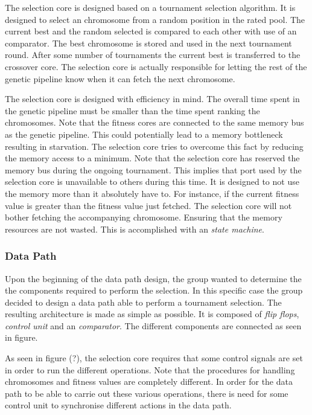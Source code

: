 The selection core is designed based on a tournament selection algorithm. It is designed to select an chromosome from a random position in the rated pool. The current best and the random selected is compared to each other with use of an comparator. The best chromosome is stored and used in the next tournament round. After some number of tournaments the current best is transferred to the crossover core. The selection core is actually responsible for letting the rest of the genetic pipeline know when it can fetch the next chromosome. 

The selection core is designed with efficiency in mind. The overall time spent in the genetic pipeline must be smaller than the time spent ranking the chromosomes. Note that the fitness cores are connected to the same memory bus as the genetic pipeline. This could potentially lead to a memory bottleneck resulting in starvation. The selection core tries to overcome this fact by reducing the memory access to a minimum. Note that the selection core has reserved the memory bus during the ongoing tournament. This implies that port used by the selection core is unavailable to others during this time. It is designed to not use the memory more than it absolutely have to. For instance, if the current fitness value is greater than the fitness value just fetched. The selection core will not bother fetching the accompanying chromosome. Ensuring that the memory resources are not wasted. This is accomplished with an \emph{state machine}. 



\subsubsection{Data Path}
Upon the beginning of the data path design, the group wanted to determine the the components required to perform the selection. In this specific case the group decided to design a data path able to perform a tournament selection. The resulting architecture is made as simple as possible.  It is composed of \emph{flip flops}, \emph{control unit} and an \emph{comparator}. The different components are connected as seen in figure.

As seen in figure (?), the selection core requires that some control signals are set in order to run the different operations. Note that the procedures for handling chromosomes and fitness values are completely different. In order for the data path to be able to carrie out these various operations, there is need for some control unit to synchronise different actions in the data path. 



